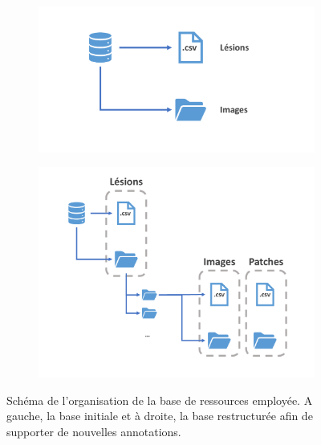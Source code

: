 \begin{figure}[H]
\centering
    \begin{subfigure}{.45\textwidth}
      \centering
      \includegraphics[width=\linewidth]{contents/chapter_2/resources/scheme_dbstructure_old.pdf}
    \end{subfigure}
    \begin{subfigure}{.45\textwidth}
      \centering
      \includegraphics[width=\linewidth]{contents/chapter_2/resources/scheme_dbstructure_new.pdf}
    \end{subfigure}
    \caption{Schéma de l'organisation de la base de ressources employée. A gauche, la base initiale et à droite, la base restructurée afin de supporter de nouvelles annotations.}
    \label{fig:db_structure}
\end{figure}\par
